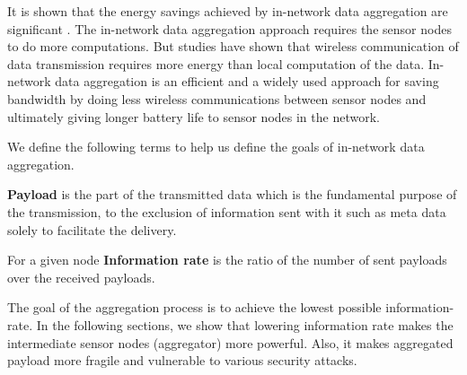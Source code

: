 	It is shown that the energy savings achieved by in-network data aggregation are significant \cite{madden2002tag}.
	The in-network data aggregation approach requires the sensor nodes to do more computations.
	But studies have shown that wireless communication of data transmission requires more energy than local computation of the data. 
	In-network data aggregation is an efficient and a widely used approach for saving bandwidth by doing less wireless communications between sensor nodes and ultimately giving longer battery life to sensor nodes in the network.

	We define the following terms to help us define the goals of in-network data aggregation.
	\begin{definition}\label{def:payload}\cite{PayloadWiKi}
		\textbf{Payload} is the part of the transmitted data which is the fundamental purpose of the transmission, to the exclusion of information sent with it such as meta data solely to facilitate the delivery.
	\end{definition}
	\begin{definition}\label{def:information-rate}
		For a given node \textbf {Information rate} is the ratio of the number of sent payloads over the received payloads.
	\end{definition}
	The goal of the aggregation process is to achieve the lowest possible information-rate.
	In the following sections, we show that lowering information rate makes the intermediate sensor nodes (aggregator) more powerful.
	Also, it makes aggregated payload more fragile and vulnerable to various security attacks.

